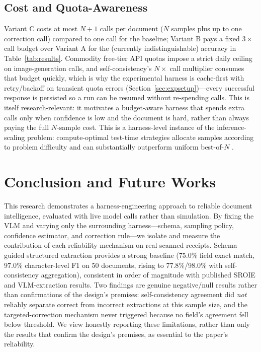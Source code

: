 \documentclass[conference]{IEEEtran}
\begin{document}
\subsection{Cost and Quota-Awareness}
Variant C costs at most \(N + 1\) calls per document (\(N\) samples plus up to one correction call) compared to one call for the baseline; Variant B pays a fixed \(3\times\) call budget over Variant A for the (currently indistinguishable) accuracy in Table~\ref{tab:results}. Commodity free-tier API quotas impose a strict daily ceiling on image-generation calls, and self-consistency's \(N\times\) call multiplier consumes that budget quickly, which is why the experimental harness is cache-first with retry/backoff on transient quota errors (Section~\ref{sec:expsetup})---every successful response is persisted so a run can be resumed without re-spending calls. This is itself research-relevant: it motivates a budget-aware harness that spends extra calls only when confidence is low and the document is hard, rather than always paying the full \(N\)-sample cost. This is a harness-level instance of the inference-scaling problem: compute-optimal test-time strategies allocate samples according to problem difficulty and can substantially outperform uniform best-of-\(N\) \cite{b32}.

\section{Conclusion and Future Works}
\label{sec:conclusion}

This research demonstrates a harness-engineering approach to reliable document intelligence, evaluated with live model calls rather than simulation. By fixing the VLM and varying only the surrounding harness---schema, sampling policy, confidence estimator, and correction rule---we isolate and measure the contribution of each reliability mechanism on real scanned receipts. Schema-guided structured extraction provides a strong baseline (75.0\% field exact match, 97.0\% character-level F1 on 50 documents, rising to 77.8\%/98.0\% with self-consistency aggregation), consistent in order of magnitude with published SROIE and VLM-extraction results. Two findings are genuine negative/null results rather than confirmations of the design's premises: self-consistency agreement did \emph{not} reliably separate correct from incorrect extractions at this sample size, and the targeted-correction mechanism never triggered because no field's agreement fell below threshold. We view honestly reporting these limitations, rather than only the results that confirm the design's premises, as essential to the paper's reliability.
\end{document}
